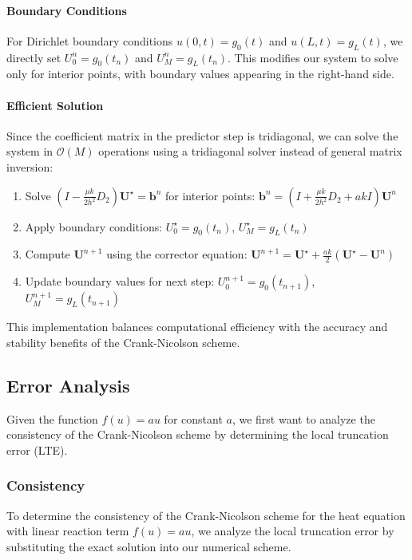 \paragraph{Boundary Conditions}
For Dirichlet boundary conditions $u(0,t) = g_0(t)$ and $u(L,t) = g_L(t)$, we directly set $U_0^n = g_0(t_n)$ and $U_M^n = g_L(t_n)$. This modifies our system to solve only for interior points, with boundary values appearing in the right-hand side.

\paragraph{Efficient Solution}
Since the coefficient matrix in the predictor step is tridiagonal, we can solve the system in $\mathcal{O}(M)$ operations using a tridiagonal solver instead of general matrix inversion:
\begin{enumerate}
  \item Solve $(I - \frac{\mu k}{2h^2}D_2) \mathbf{U}^{\star} = \mathbf{b}^n$ for interior points: $\mathbf{b}^n = (I + \frac{\mu k}{2h^2}D_2 + akI) \mathbf{U}^n$
  \item Apply boundary conditions: $U_0^{\star} = g_0(t_n)$, $U_M^{\star} = g_L(t_n)$
  \item Compute $\mathbf{U}^{n+1}$ using the corrector equation: $\mathbf{U}^{n+1} = \mathbf{U}^{\star} + \frac{ak}{2}(\mathbf{U}^{\star} - \mathbf{U}^n)$
  \item Update boundary values for next step: $U_0^{n+1} = g_0(t_{n+1})$, $U_M^{n+1} = g_L(t_{n+1})$
\end{enumerate}

This implementation balances computational efficiency with the accuracy and stability benefits of the Crank-Nicolson scheme.

\subsection{Error Analysis}
Given the function \(f(u) = au\) for constant \(a\), we first want to analyze the consistency of the Crank-Nicolson scheme by determining the local truncation error (LTE).

\subsubsection{Consistency}
To determine the consistency of the Crank-Nicolson scheme for the heat equation with linear reaction term $f(u) = au$, we analyze the local truncation error by substituting the exact solution into our numerical scheme.

